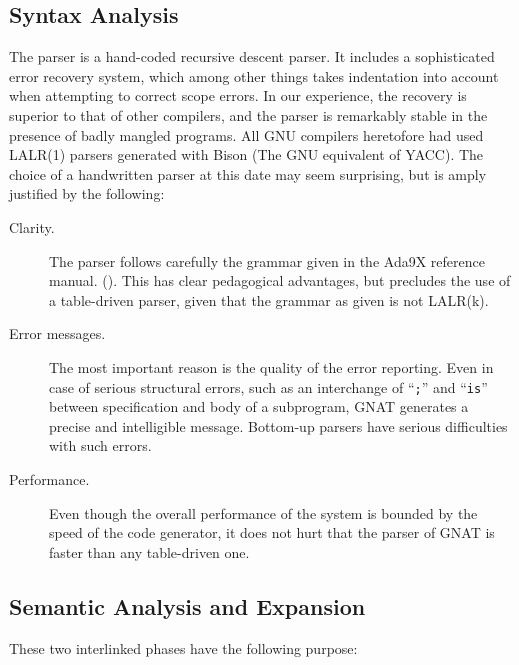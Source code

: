 




\subsection{Syntax Analysis}

The parser is a hand-coded recursive descent parser. It includes a sophisticated
error recovery system, which among other things takes indentation into
account when attempting to correct scope errors. In  our experience, the
recovery is superior to that of other compilers,  and the parser is remarkably
stable in the presence of badly mangled programs. All GNU compilers heretofore
had used LALR(1) parsers generated with Bison (The GNU equivalent of YACC).
The choice of a handwritten parser at this date may seem surprising, but is
amply justified by the following:

\begin{description}

\item[Clarity.] The parser follows carefully the grammar given in the
Ada9X reference manual. (\cite{rm-9x}). This has clear pedagogical advantages,
but precludes the use of a table-driven parser, given that the grammar 
as given is not LALR(k).
 
\item[Error messages.] The most important reason is the quality of the
error reporting. Even in case of serious structural errors,  such as an
interchange of ``{\tt ;}'' and ``{\tt is}''  between specification and body
of a subprogram, GNAT generates a precise and intelligible message. Bottom-up
parsers have serious difficulties with such errors.

\item[Performance.] Even though the overall performance of the system is
bounded by the speed of the code generator, it does not hurt that the parser
of GNAT is faster than any table-driven one.
\end{description}


\subsection{Semantic Analysis and Expansion}

These two interlinked phases have the following purpose: 

